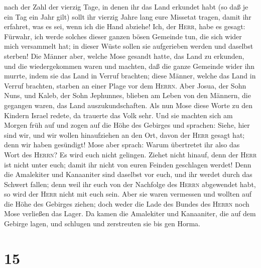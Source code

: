  nach der Zahl der vierzig Tage, in denen ihr das Land
erkundet habt (so daß je ein Tag ein Jahr gilt) sollt ihr vierzig Jahre
lang eure Missetat tragen, damit ihr erfahret, was es sei, wenn ich die
Hand abziehe!  Ich, der \textsc{Herr}, habe es gesagt:
Fürwahr, ich werde solches dieser ganzen bösen Gemeinde tun, die sich
wider mich versammelt hat; in dieser Wüste sollen sie aufgerieben werden
und daselbst sterben!  Die Männer aber, welche Mose
gesandt hatte, das Land zu erkunden, und die wiedergekommen waren und
machten, daß die ganze Gemeinde wider ihn murrte, indem sie das Land in
Verruf brachten;  diese Männer, welche das Land in Verruf
brachten, starben an einer Plage vor dem \textsc{Herrn}. 
Aber Josua, der Sohn Nuns, und Kaleb, der Sohn Jephunnes, blieben am
Leben von den Männern, die gegangen waren, das Land auszukundschaften.
 Als nun Mose diese Worte zu den Kindern Israel redete,
da trauerte das Volk sehr.  Und sie machten sich am
Morgen früh auf und zogen auf die Höhe des Gebirges und sprachen: Siehe,
hier sind wir, und wir wollen hinaufziehen an den Ort, davon der
\textsc{Herr} gesagt hat; denn wir haben gesündigt! Mose aber sprach:
 Warum übertretet ihr also das Wort des \textsc{Herrn}?
Es wird euch nicht gelingen.  Ziehet nicht hinauf, denn
der \textsc{Herr} ist nicht unter euch; damit ihr nicht von euren
Feinden geschlagen werdet!  Denn die Amalekiter und
Kanaaniter sind daselbst vor euch, und ihr werdet durch das Schwert
fallen; denn weil ihr euch von der Nachfolge des \textsc{Herrn}
abgewendet habt, so wird der \textsc{Herr} nicht mit euch sein.
 Aber sie waren vermessen und wollten auf die Höhe des
Gebirges ziehen; doch weder die Lade des Bundes des \textsc{Herrn} noch
Mose verließen das Lager.  Da kamen die Amalekiter und
Kanaaniter, die auf dem Gebirge lagen, und schlugen und zerstreuten sie
bis gen Horma.

\hypertarget{section-14}{%
\section{15}\label{section-14}}

